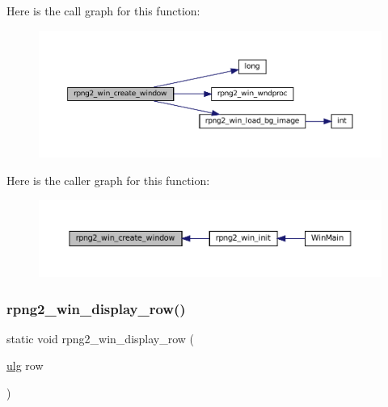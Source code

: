 Here is the call graph for this function\+:
\nopagebreak
\begin{figure}[H]
\begin{center}
\leavevmode
\includegraphics[width=350pt]{rpng2-win_8c_a9316682fba34635203c7fe44a4a41103_cgraph}
\end{center}
\end{figure}
Here is the caller graph for this function\+:
\nopagebreak
\begin{figure}[H]
\begin{center}
\leavevmode
\includegraphics[width=350pt]{rpng2-win_8c_a9316682fba34635203c7fe44a4a41103_icgraph}
\end{center}
\end{figure}
\mbox{\label{rpng2-win_8c_ac1b02b7289e3c18572f9de09314a0326}} 
\subsubsection{\texorpdfstring{rpng2\+\_\+win\+\_\+display\+\_\+row()}{rpng2\_win\_display\_row()}}
{\footnotesize\ttfamily static void rpng2\+\_\+win\+\_\+display\+\_\+row (\begin{DoxyParamCaption}\item[{\mbox{\hyperlink{readpng_8h_abd6f60bf9450af2ecb94097a32c19a64}{ulg}}}]{row }\end{DoxyParamCaption})\hspace{0.3cm}{\ttfamily [static]}}

